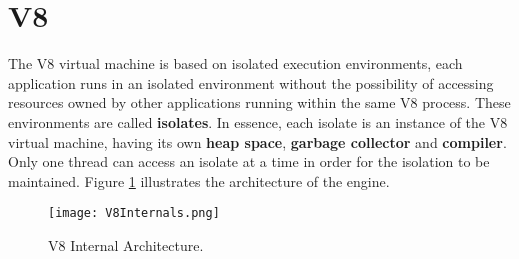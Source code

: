 \documentclass{l4proj}
\begin{document}
\section{V8}
\hspace*{3em} The V8 virtual machine is based on isolated execution environments, each application runs in an isolated environment without the possibility of accessing resources owned by other applications running within the same V8 process. These environments are called \textbf{isolates}. In essence, each isolate is an instance of the V8 virtual machine, having its own \textbf{heap space}, \textbf{garbage collector} and \textbf{compiler}. Only one thread can access an isolate at a time in order for the isolation to be maintained. Figure \ref{v8arch} illustrates the architecture of the engine.

\begin{figure}[!ht]
  \centering
    \texttt{[image: V8Internals.png]}
  \caption{V8 Internal Architecture.}
    \label{v8arch}
\end{figure}
\end{document}
